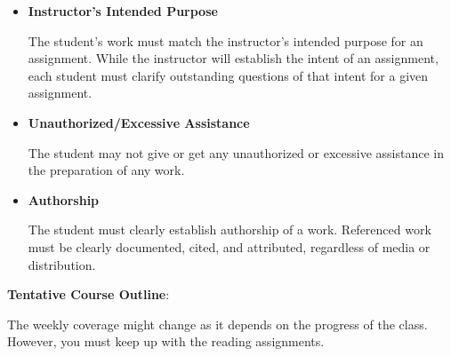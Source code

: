 \documentclass[11pt]{article}
\begin{document}
\begin{itemize}
\vspace{5mm}

\item \textbf{Instructor's Intended Purpose}

\hspace{3mm}
\hangindent=5mm The student's work must match the instructor's intended purpose for an assignment. 
While the instructor will establish the intent of an assignment, each student must clarify 
outstanding questions of that intent for a given assignment. 

\item \textbf{Unauthorized/Excessive Assistance}

\hspace{3mm}
\hangindent=5mm The student may not give or get any unauthorized or excessive assistance in the 
preparation of any work.

\item \textbf{Authorship}

\hspace{3mm}
\hangindent=5mm The student must clearly establish authorship of a work. Referenced work must 
be clearly documented, cited, and attributed, regardless of media or distribution. 

\end{itemize}

\newpage

\textbf {\large Tentative Course Outline}:

The weekly coverage might change as it depends on the progress of the class.  
However, you must keep up with the reading assignments.
   
\end{document}
